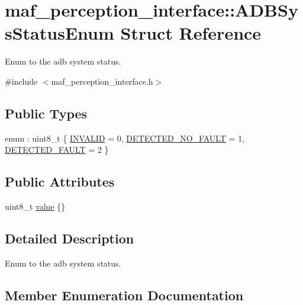 \hypertarget{structmaf__perception__interface_1_1ADBSysStatusEnum}{}\section{maf\+\_\+perception\+\_\+interface\+:\+:A\+D\+B\+Sys\+Status\+Enum Struct Reference}
\label{structmaf__perception__interface_1_1ADBSysStatusEnum}


Enum to the adb system status.  




{\ttfamily \#include $<$maf\+\_\+perception\+\_\+interface.\+h$>$}

\subsection*{Public Types}
\begin{DoxyCompactItemize}
\item 
enum \+: uint8\+\_\+t \{ \hyperlink{structmaf__perception__interface_1_1ADBSysStatusEnum_aab21b0ad11c629a48ac2a66ab70aa6a7aa1b7144eeb6e10d3b9bf3d9dd27c262e}{I\+N\+V\+A\+L\+ID} = 0, 
\hyperlink{structmaf__perception__interface_1_1ADBSysStatusEnum_aab21b0ad11c629a48ac2a66ab70aa6a7a10a099a7bed89a3b2324b71922fac1de}{D\+E\+T\+E\+C\+T\+E\+D\+\_\+\+N\+O\+\_\+\+F\+A\+U\+LT} = 1, 
\hyperlink{structmaf__perception__interface_1_1ADBSysStatusEnum_aab21b0ad11c629a48ac2a66ab70aa6a7ac362ee1e156e1b2979daa729df52433d}{D\+E\+T\+E\+C\+T\+E\+D\+\_\+\+F\+A\+U\+LT} = 2
 \}
\end{DoxyCompactItemize}
\subsection*{Public Attributes}
\begin{DoxyCompactItemize}
\item 
uint8\+\_\+t \hyperlink{structmaf__perception__interface_1_1ADBSysStatusEnum_a4c4fb3b48a8c4edc6354ce74fe1e97c2}{value} \{\}
\end{DoxyCompactItemize}


\subsection{Detailed Description}
Enum to the adb system status. 

\subsection{Member Enumeration Documentation}
\mbox{\label{structmaf__perception__interface_1_1ADBSysStatusEnum_aab21b0ad11c629a48ac2a66ab70aa6a7}} 
